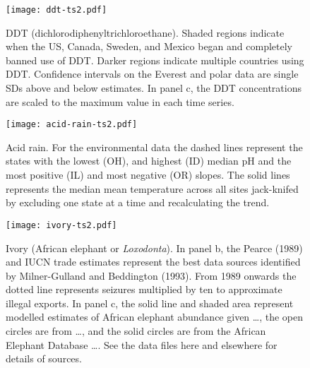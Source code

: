 \documentclass[12pt]{article}
\title{}
\date{}
\begin{document}
\maketitle

\begin{figure}[htbp]
	\centering
		\texttt{[image: ddt-ts2.pdf]}
	\caption{DDT (dichlorodiphenyltrichloroethane). Shaded regions indicate when the US, Canada, Sweden, and Mexico began and completely banned use of DDT. Darker regions indicate multiple countries using DDT. Confidence intervals on the Everest and polar data are single SDs above and below estimates.  In panel c, the DDT concentrations are scaled to the maximum value in each time series.}
	\label{fig:ddt-ts2}
\end{figure}

\begin{figure}[htbp]
	\centering
		\texttt{[image: acid-rain-ts2.pdf]}
	\caption{Acid rain. For the environmental data the dashed lines represent the states with the lowest (OH), and highest (ID) median pH and the most positive (IL) and most negative (OR) slopes. The solid lines represents the median mean temperature across all sites jack-knifed by excluding one state at a time and recalculating the trend.}
	\label{fig:acid-rain-ts2}
\end{figure}

\begin{figure}[htbp]
	\centering
		\texttt{[image: ivory-ts2.pdf]}
	\caption{Ivory (African elephant or \textit{Loxodonta}). In panel b, the Pearce (1989) and IUCN trade estimates represent the best data sources identified by Milner-Gulland and Beddington (1993). From 1989 onwards the dotted line represents seizures multiplied by ten to approximate illegal exports. In panel c, the solid line and shaded area represent modelled estimates of African elephant abundance given \ldots, the open circles are from \ldots, and the solid circles are from the African Elephant Database \ldots. See the data files here and elsewhere for details of sources.}
	\label{fig:ivory-ts2}
\end{figure}



%
\end{document}
